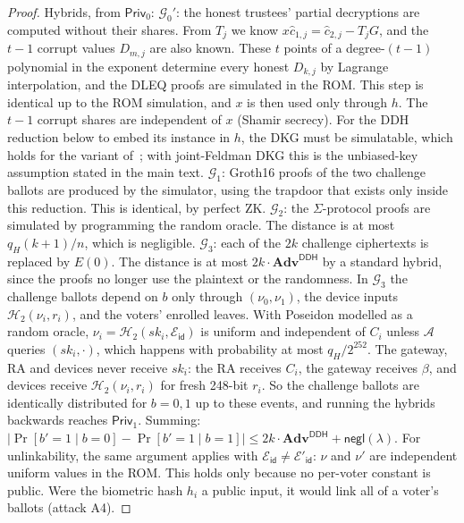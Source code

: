 \documentclass[10pt,letterpaper,journal]{IEEEtran}
\begin{document}
\begin{proof}
Hybrids, from $\mathsf{Priv}_0$:
$\mathcal{G}_0'$: the honest trustees' partial decryptions are computed without their shares. From $T_j$ we know $x\hat{c}_{1,j} = \hat{c}_{2,j} - T_jG$, and the $t-1$ corrupt values $D_{m,j}$ are also known. These $t$ points of a degree-$(t-1)$ polynomial in the exponent determine every honest $D_{k,j}$ by Lagrange interpolation, and the DLEQ proofs are simulated in the ROM. This step is identical up to the ROM simulation, and $x$ is then used only through $h$. The $t-1$ corrupt shares are independent of $x$ (Shamir secrecy). For the DDH reduction below to embed its instance in $h$, the DKG must be simulatable, which holds for the variant of~\cite{Gennaro2007}; with joint-Feldman DKG this is the unbiased-key assumption stated in the main text.
$\mathcal{G}_1$: Groth16 proofs of the two challenge ballots are produced by the simulator, using the trapdoor that exists only inside this reduction. This is identical, by perfect ZK.
$\mathcal{G}_2$: the $\Sigma$-protocol proofs are simulated by programming the random oracle. The distance is at most $q_H(k+1)/n$, which is negligible.
$\mathcal{G}_3$: each of the $2k$ challenge ciphertexts is replaced by $E(0)$. The distance is at most $2k \cdot \mathbf{Adv}^{\mathsf{DDH}}$ by a standard hybrid, since the proofs no longer use the plaintext or the randomness.
In $\mathcal{G}_3$ the challenge ballots depend on $b$ only through $(\nu_0, \nu_1)$, the device inputs $\mathcal{H}_2(\nu_i, r_i)$, and the voters' enrolled leaves. With Poseidon modelled as a random oracle, $\nu_i = \mathcal{H}_2(sk_i, \mathcal{E}_{\mathsf{id}})$ is uniform and independent of $C_i$ unless $\mathcal{A}$ queries $(sk_i, \cdot)$, which happens with probability at most $q_H/2^{252}$. The gateway, RA and devices never receive $sk_i$: the RA receives $C_i$, the gateway receives $\beta$, and devices receive $\mathcal{H}_2(\nu_i, r_i)$ for fresh 248-bit $r_i$. So the challenge ballots are identically distributed for $b = 0, 1$ up to these events, and running the hybrids backwards reaches $\mathsf{Priv}_1$. Summing: $|\Pr[b'=1 \mid b=0] - \Pr[b'=1 \mid b=1]| \leq 2k \cdot \mathbf{Adv}^{\mathsf{DDH}} + \mathsf{negl}(\lambda)$. For unlinkability, the same argument applies with $\mathcal{E}_{\mathsf{id}} \neq \mathcal{E}'_{\mathsf{id}}$: $\nu$ and $\nu'$ are independent uniform values in the ROM. This holds only because no per-voter constant is public. Were the biometric hash $h_i$ a public input, it would link all of a voter's ballots (attack A4).
\end{proof}
\end{document}
